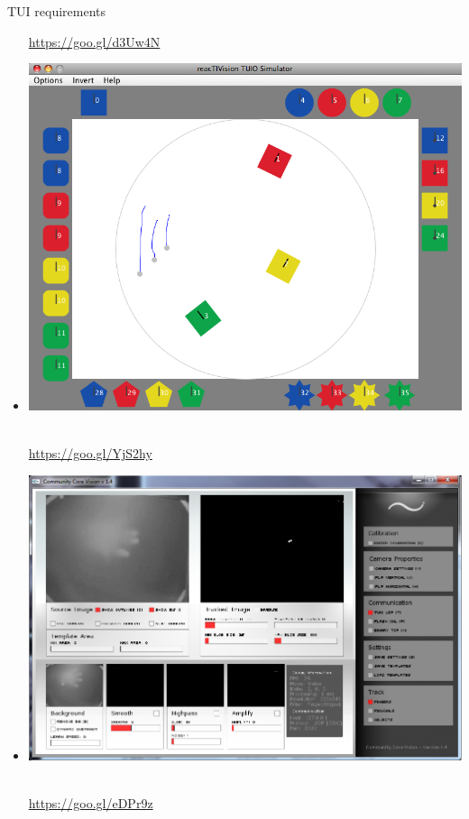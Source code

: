 \begin{frame}
\begin{block}{TUI requirements}
\begin{minipage}{1.0\linewidth}
\begin{itemize}
\begin{scriptsize}
\url{https://goo.gl/d3Uw4N}
\end{scriptsize}%
\item[] \includegraphics[scale=.08]{images/reactivision04.png}$\;$
\begin{scriptsize}
\url{https://goo.gl/YjS2hy}
\end{scriptsize}
\item[] \includegraphics[scale=.09]{images/CCV.png}$\;$
\begin{scriptsize}
\url{https://goo.gl/eDPr9z}
\end{scriptsize}
\end{itemize}
\end{minipage}
\end{block}
\end{frame}

